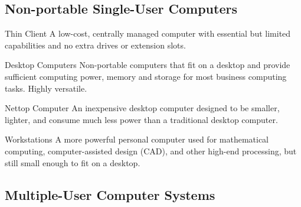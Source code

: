 \documentclass[\main/notes.tex]{subfiles}
\begin{document}
			\subsection{Non-portable Single-User Computers}
				\begin{definition}{Thin Client}
					A low-cost, centrally managed computer with essential but limited capabilities and no extra drives or extension slots.
				\end{definition}
				\begin{definition}{Desktop Computers}
					Non-portable computers that fit on a desktop and provide sufficient computing power, memory and storage for most business computing tasks. Highly versatile.
				\end{definition}
				\begin{definition}{Nettop Computer}
					An inexpensive desktop computer designed to be smaller, lighter, and consume much less power than a traditional desktop computer.
				\end{definition}
				\begin{definition}{Workstations}
					A more powerful personal computer used for mathematical computing, computer-assisted design (CAD), and other high-end processing, but still small enough to fit on a desktop.
				\end{definition}
			\subsection{Multiple-User Computer Systems}
\end{document}
